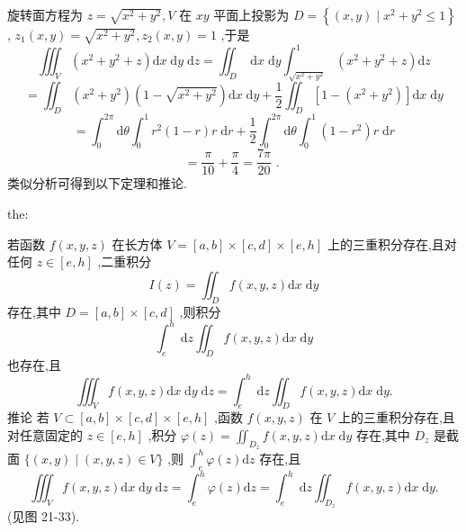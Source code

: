 \begin{solution}

\end{solution}
旋转面方程为 \(z = \sqrt{{x}^{2} + {y}^{2}},V\) 在 \({xy}\) 平面上投影为 \(D = \left\{  {\left( {x,y}\right)  \mid  {x}^{2} + {y}^{2} \leq  1}\right\}\) , \({z}_{1}\left( {x,y}\right)  = \sqrt{{x}^{2} + {y}^{2}},{z}_{2}\left( {x,y}\right)  = 1\) ,于是
\[
{\iiint }_{V}\left( {{x}^{2} + {y}^{2} + z}\right) \mathrm{d}x\mathrm{\;d}y\mathrm{\;d}z = {\iint }_{D}\mathrm{\;d}x\mathrm{\;d}y{\int }_{\sqrt{{x}^{2} + {y}^{2}}}^{1}\left( {{x}^{2} + {y}^{2} + z}\right) \mathrm{d}z
\]
\[
= {\iint }_{D}\left( {{x}^{2} + {y}^{2}}\right) \left( {1 - \sqrt{{x}^{2} + {y}^{2}}}\right) \mathrm{d}x\mathrm{\;d}y + \frac{1}{2}{\iint }_{D}\left\lbrack  {1 - \left( {{x}^{2} + {y}^{2}}\right) }\right\rbrack  \mathrm{d}x\mathrm{\;d}y
\]
\[
= {\int }_{0}^{2\pi }\mathrm{d}\theta {\int }_{0}^{1}{r}^{2}\left( {1 - r}\right) r\mathrm{\;d}r + \frac{1}{2}{\int }_{0}^{2\pi }\mathrm{d}\theta {\int }_{0}^{1}\left( {1 - {r}^{2}}\right) r\mathrm{\;d}r
\]
\[
= \frac{\pi }{10} + \frac{\pi }{4} = \frac{7\pi }{20}\text{ . }
\]
类似分析可得到以下定理和推论.

\begin{theorem}{}{the:}

\end{theorem}
 若函数 \(f\left( {x,y,z}\right)\) 在长方体 \(V = \left\lbrack  {a,b}\right\rbrack   \times  \left\lbrack  {c,d}\right\rbrack   \times  \left\lbrack  {e,h}\right\rbrack\) 上的三重积分存在,且对任何 \(z \in  \left\lbrack  {e,h}\right\rbrack\) ,二重积分
\[
I\left( z\right)  = {\iint }_{D}f\left( {x,y,z}\right) \mathrm{d}x\mathrm{\;d}y
\]
存在,其中 \(D = \left\lbrack  {a,b}\right\rbrack   \times  \left\lbrack  {c,d}\right\rbrack\) ,则积分
\[
{\int }_{e}^{h}\mathrm{\;d}z{\iint }_{D}f\left( {x,y,z}\right) \mathrm{d}x\mathrm{\;d}y
\]
也存在,且
\[
{\iiint }_{V}f\left( {x,y,z}\right) \mathrm{d}x\mathrm{\;d}y\mathrm{\;d}z = {\int }_{e}^{h}\mathrm{\;d}z{\iint }_{D}f\left( {x,y,z}\right) \mathrm{d}x\mathrm{\;d}y.
\]
推论 若 \(V \subset  \left\lbrack  {a,b}\right\rbrack   \times  \left\lbrack  {c,d}\right\rbrack   \times  \left\lbrack  {e,h}\right\rbrack\) ,函数 \(f\left( {x,y,z}\right)\) 在 \(V\) 上的三重积分存在,且对任意固定的 \(z \in  \left\lbrack  {e,h}\right\rbrack\) ,积分 \(\varphi \left( z\right)  = {\iint }_{{D}_{z}}f\left( {x,y,z}\right) \mathrm{d}x\mathrm{\;d}y\) 存在,其中 \({D}_{z}\) 是截面 \(\{ \left( {x,y}\right)  \mid  \left( {x,y,z}\right)  \in  V\}\) ,则 \({\int }_{e}^{h}\varphi \left( z\right) \mathrm{d}z\) 存在,且
\[
{\iiint }_{V}f\left( {x,y,z}\right) \mathrm{d}x\mathrm{\;d}y\mathrm{\;d}z = {\int }_{e}^{h}\varphi \left( z\right) \mathrm{d}z = {\int }_{e}^{h}\mathrm{\;d}z{\iint }_{{D}_{z}}f\left( {x,y,z}\right) \mathrm{d}x\mathrm{\;d}y.
\]
(见图 21-33).

